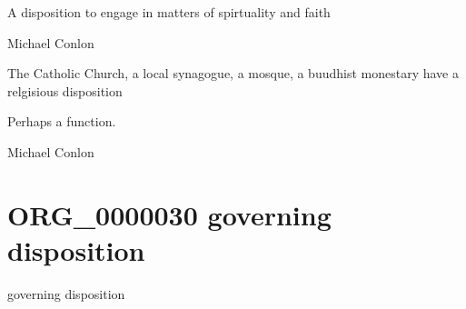 \documentclass[letterpaper,10pt,english]{sphinxmanual}
\begin{document}
\begin{sphinxShadowBox}

\sphinxAtStartPar
A disposition to engage in matters of spirtuality and faith
\end{sphinxShadowBox}

\begin{sphinxShadowBox}

\sphinxAtStartPar
Michael Conlon 
\end{sphinxShadowBox}

\begin{sphinxShadowBox}

\sphinxAtStartPar
The Catholic Church, a local synagogue, a mosque, a buudhist monestary have a relgisious disposition
\end{sphinxShadowBox}

\begin{sphinxShadowBox}

\sphinxAtStartPar
Perhaps a function.
\end{sphinxShadowBox}

\begin{sphinxShadowBox}

\sphinxAtStartPar
Michael Conlon 
\end{sphinxShadowBox}
\begin{quote}
\label{\detokenize{doc-ORG_0000030:org-0000030}}\label{\detokenize{doc-ORG_0000030:governing-disposition}}\label{\detokenize{doc-ORG_0000030:org-0000030}}
\ignorespaces \end{quote}


\section{ORG\_0000030 \sphinxhyphen{} governing disposition}
\label{\detokenize{doc-ORG_0000030:org-0000030-governing-disposition}}\label{\detokenize{doc-ORG_0000030:index-0}}\label{\detokenize{doc-ORG_0000030::doc}}
\begin{sphinxShadowBox}

\sphinxAtStartPar
governing disposition
\end{sphinxShadowBox}
\end{document}
